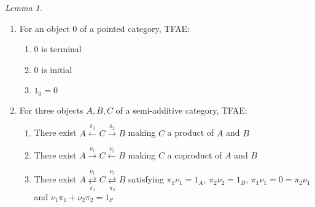 \documentclass[a4paper]{article}
\theoremstyle{definition}
\theoremstyle{remark}
\theoremstyle{default}
\newtheorem{lemma}[definition]{Lemma}
\numberwithin{definition}{section}
\newcommand*\rightleft[2]{\overset{#1}{\underset{#2}{\rightleftarrows}}}
\begin{document}
\begin{lemma}
	\begin{enumerate}[label=\alph*.]
		\item For an object 0 of a pointed category, TFAE:
			\begin{enumerate}[label=\roman*.]
				\item 0 is terminal
				\item 0 is initial
				\item $1_0 = 0$
			\end{enumerate}
		\item For three objects $A, B, C$ of a semi-additive category, TFAE:
			\begin{enumerate}[label=\roman*.]
				\item There exist $A \overset{\pi_1}{\longleftarrow} C \overset{\pi_2}{\longrightarrow} B$ making $C$ a product of $A$ and $B$
				\item There exist $A \overset{\nu_1}{\longrightarrow} C \overset{\nu_2}{\longleftarrow} B$ making $C$ a coproduct of $A$ and $B$
				\item There exist $A \rightleft{\nu_1}{\pi_1} C \rightleft{\nu_2}{\pi_2} B$ satisfying $\pi_1\nu_1=1_A$, $\pi_2\nu_2=1_B$, $\pi_1\nu_1=0=\pi_2\nu_1$ and $\nu_1\pi_1+\nu_2\pi_2 = 1_\mathcal{C}$
			\end{enumerate}
	\end{enumerate}
	\label{72}
\end{lemma}
\end{document}
